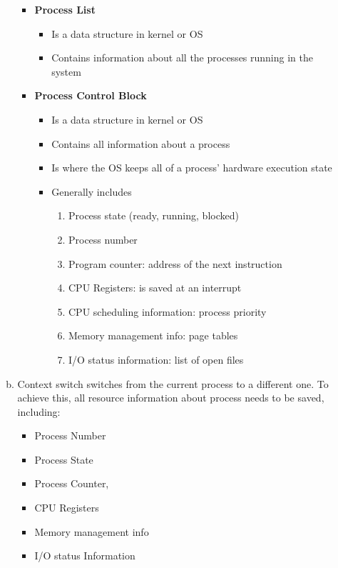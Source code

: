 \documentclass[12pt]{article}
\begin{document}
\begin{enumerate}[1.]
\begin{enumerate}[a)]
\begin{itemize}
            \item \textbf{Process List}

            \begin{itemize}
                \item Is a data structure in kernel or OS
                \item Contains information about all the processes running in the system
            \end{itemize}

            \item \textbf{Process Control Block}

            \begin{itemize}
                \item Is a data structure in kernel or OS
                \item Contains all information about a process
                \item Is where the OS keeps all of a process' hardware execution state
                \item Generally includes

                \begin{enumerate}[1.]
                    \item Process state (ready, running, blocked)
                    \item Process number
                    \item Program counter: address of the next instruction
                    \item CPU Registers: is saved at an interrupt
                    \item CPU scheduling information: process priority
                    \item Memory management info: page tables
                    \item I/O status information: list of open files
                \end{enumerate}
            \end{itemize}
        \end{itemize}

        \item

        Context switch switches from the current process to a different one.
        To achieve this, all resource information about process needs to be saved,
        including:

        \begin{itemize}
            \item Process Number
            \item Process State
            \item Process Counter,
            \item CPU Registers
            \item Memory management info
            \item I/O status Information
        \end{itemize}


\end{enumerate}
\end{enumerate}
\end{document}
